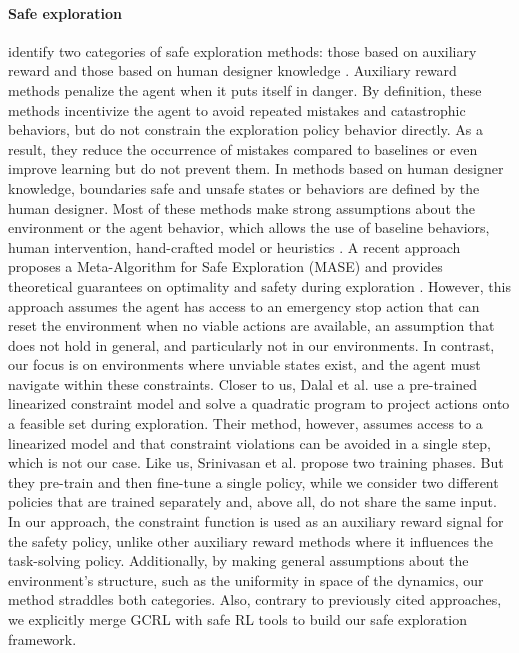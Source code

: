 \paragraph{\textbf{Safe exploration}}
\citeauthor{exploration_survey} identify two categories of safe exploration methods: those based on
auxiliary reward and those based on human designer knowledge \cite{exploration_survey}. 
Auxiliary reward methods penalize the agent when it puts itself in danger. 
By definition, these methods incentivize the agent to avoid repeated mistakes and catastrophic behaviors, 
but do not constrain the exploration policy behavior directly. As a result, they reduce the occurrence of 
mistakes compared to baselines \cite{karimpanal2020learning} or even improve learning 
\cite{lipton2018sisyphean, fatemiDeadEnds} but do not prevent them.
In methods based on human designer knowledge, boundaries safe and unsafe states or behaviors 
are defined by the human designer. Most of these methods make strong assumptions about the environment
or the agent behavior, which allows the use of baseline behaviors, 
human intervention, hand-crafted model or heuristics
\cite{GarciaSafeExp2012,VerifSafeExp,TrialWithoutErrorSafeExp,SafeExpGPMDP}. 
A recent approach proposes a Meta-Algorithm for Safe Exploration (MASE) and provides theoretical guarantees on 
optimality and safety during exploration \cite{MASESafeExp}. However, this approach assumes the agent has access to an emergency stop action that can reset the environment when no viable actions are available, an assumption that does not hold in general, and particularly not in our environments. In contrast, our focus is on environments where unviable states exist, and the agent must navigate within these constraints.
Closer to us, Dalal et al. \cite{dalal2018safetyLayer} use a pre-trained linearized constraint model and solve a quadratic program to project actions onto a feasible set during exploration. Their method, however, assumes access to a linearized model and that constraint violations can be avoided in a single step, which is not our case.
Like us, Srinivasan et al. \cite{2020safetyCritic} propose two training phases. But they pre-train and then fine-tune a single policy, while we consider two different policies that are trained separately and, above all, do not share the same input. 
In our approach, the constraint function is used as an auxiliary reward signal for the safety policy, unlike other auxiliary reward methods where it influences the task-solving policy. Additionally, by making general assumptions about the environment's structure, such as the uniformity in space of the dynamics, our method straddles both categories.
Also, contrary to previously cited approaches, we explicitly merge GCRL with safe RL tools to build our safe exploration framework.



